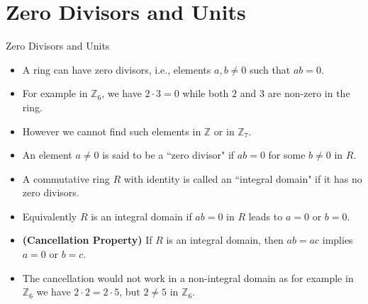 \documentclass[ %
 10pt, xcolor={dvipsnames,svgnames,x11names,hyperref},
   hyperref={colorlinks=true,citecolor=green,linkcolor=DarkRed,urlcolor=ProcessBlue,anchorcolor=blue}
  ]{beamer}
\newenvironment{stepitemize}{\begin{itemize}[<+->]}{\end{itemize} }
\newcommand{\Z}{\mathbb{Z}}
\begin{document}
\section{Zero Divisors and Units}
\begin{frame}{Zero Divisors and Units}
    \begin{stepitemize}
    \item A ring can have zero divisors, i.e., elements $a,b \neq 0$ such that $ab=0$. 
    \item For example in $\Z_6$, we have $2\cdot 3=0$ while both $2$ and $3$ are non-zero in the ring. 
    \item However we cannot find such elements in $\Z$ or in $\Z_7$.  
    \item  An element $a\neq 0$ is said to be a ``zero divisor" if $ab=0$ for some $b\neq 0$ in $R$.
    \item 
    A commutative ring $R$ with identity is called an ``integral domain" if it has no zero divisors.
    \item Equivalently $R$ is an integral domain if $ab=0$ in $R$ leads to $a=0$ or $b=0$.
    \item {\bf (Cancellation Property)} If $R$ is an integral domain, then $ab=ac$ implies $a=0$ or $b=c$.
    \item The cancellation would not work in a non-integral domain as for example in $\Z_6$ we have $2\cdot 2=2\cdot 5$, but $2\neq 5$ in $\Z_6$.
    \end{stepitemize}
\end{frame}
\end{document}
